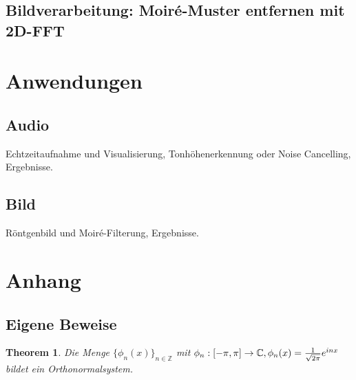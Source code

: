 \documentclass[a4paper,12pt]{article}
\newtheorem{theorem}{Theorem}[section]
\theoremstyle{definition}
\theoremstyle{remark}
\begin{document}
        \subsection{Bildverarbeitung: Moiré-Muster entfernen mit 2D-FFT}
        
        \section{Anwendungen}
        \subsection{Audio}
        Echtzeitaufnahme und Visualisierung, Tonhöhenerkennung oder Noise Cancelling, Ergebnisse.
        \subsection{Bild}
        Röntgenbild und Moiré-Filterung, Ergebnisse.
        
        \section{Anhang}
        
        \subsection{Eigene Beweise}
        \begin{theorem}\label{thm:orthonorm}
        Die Menge $\{\phi_n(x)\}_{n\in\mathbb{Z}}$ mit $\phi_n:[-\pi, \pi] \to \mathbb{C}, \\ \phi_n(x) = \frac{1}{\sqrt{2\pi}}e^{inx}$ bildet ein Orthonormalsystem.
      \end{theorem}
        
\end{document}
